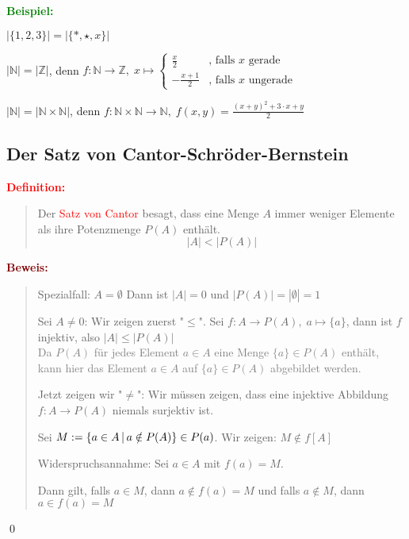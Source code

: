 \documentclass{article}
\newcommand{\smsp}{\phantom{\hspace{3px}}}
\newcommand{\red}[1]{\textcolor{red}{#1}}
\newcommand{\gray}[1]{\textcolor{gray}{#1}}
\newcommand{\green}[1]{\textcolor{green}{#1}}
\newcommand{\maroon}[1]{\textcolor{maroon}{#1}}
\newcommand{\ex}{\green{\textbf{Beispiel: }}}
\newcommand{\de}[1]{\red{\textbf{Definition: }}\begin{quote}#1\end{quote}}
\newcommand{\pr}[1]{\maroon{\textbf{Beweis: }}\begin{quote}#1\end{quote}\qed}
\newcommand{\N}{\mathbb{N}}
\newcommand{\Z}{\mathbb{Z}}
\newcommand{\vst}{\smsp \vline \smsp}
\begin{document}
\ex \begin{itemize}
    \item $|\{1, 2, 3\}| = |\{*, \star, x\}|$
    
    \begin{minipage}{9.1cm}
        \item $|\N| = |\Z|$, denn $f: \N \to \Z, \; x \mapsto 
        \begin{cases}
            \frac{x}{2} & \text{, falls } x \text{ gerade}\\
            -\frac{x + 1}{2} & \text{, falls } x \text{ ungerade}
        \end{cases}$
    \end{minipage}
    \begin{minipage}{2cm}
    \end{minipage}
    \item $|\N| = |\N \times \N|$, denn $f: \N \times \N \to \N, \; f(x,y) = \frac{(x + y)^2 + 3 \cdot x + y}{2}$
\end{itemize}

\subsection{Der Satz von Cantor-Schröder-Bernstein}
\de{Der \red{Satz von Cantor} besagt, dass eine Menge $A$ immer weniger Elemente als ihre Potenzmenge $P(A)$ enthält.
\begin{equation*}
    |A| < |P(A)|
\end{equation*}
}
\pr{
    Spezialfall: $A = \emptyset$
    Dann ist $|A| = 0$ und $|P(A)| = |{\emptyset}| = 1$

    Sei $A \neq 0$:
    Wir zeigen zuerst "$\leq$". Sei $f: A \to P(A), \; a \mapsto \{a\}$, dann ist $f$ injektiv, also $|A| \leq |P(A)|$\\
    \gray{Da $P(A)$ für jedes Element $a \in A$ eine Menge $\{a\} \in P(A)$ enthält, kann hier das Element $a \in A$ auf $\{a\} \in P(A)$ abgebildet werden.}

    Jetzt zeigen wir "$\neq$": Wir müssen zeigen, dass eine injektive Abbildung $f: A \to P(A)$ niemals surjektiv ist. 
    
    Sei $M := \{a \in A \vst a \notin P(A)\} \in P(a)$. Wir zeigen: $M \notin f[A]$

    Widerspruchsannahme: Sei $a \in A$ mit $f(a) = M$.

    Dann gilt, falls $a \in M$, dann $a \notin f(a) = M$ und falls $a \notin M$, dann $a \in f(a) =M$
}
\end{document}
